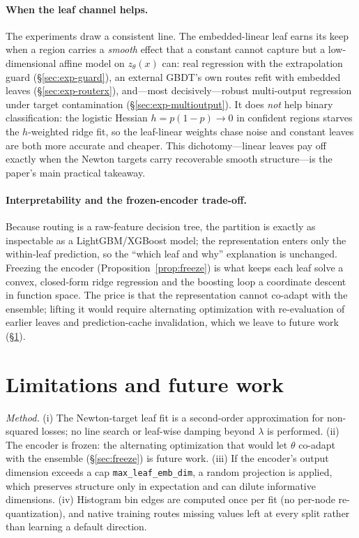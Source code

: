 \documentclass[11pt]{article}
\newcommand{\zt}{z_{\theta}}
\begin{document}
\paragraph{When the leaf channel helps.}
The experiments draw a consistent line. The embedded-linear leaf earns its keep when a
region carries a \emph{smooth} effect that a constant cannot capture but a
low-dimensional affine model on $\zt(x)$ can: real regression with the extrapolation guard
(\S\ref{sec:exp-guard}), an external GBDT's own routes refit with embedded leaves
(\S\ref{sec:exp-routerx}), and---most decisively---robust multi-output regression under
target contamination (\S\ref{sec:exp-multioutput}). It does \emph{not} help binary
classification: the logistic Hessian $h=p(1-p)\to0$ in confident regions starves the
$h$-weighted ridge fit, so the leaf-linear weights chase noise and constant leaves are both
more accurate and cheaper. This dichotomy---linear leaves pay off exactly when the Newton
targets carry recoverable smooth structure---is the paper's main practical takeaway.

\paragraph{Interpretability and the frozen-encoder trade-off.}
Because routing is a raw-feature decision tree, the partition is exactly as inspectable as a
LightGBM/XGBoost model; the representation enters only the within-leaf prediction, so the
``which leaf and why'' explanation is unchanged. Freezing the encoder
(Proposition~\ref{prop:freeze}) is what keeps each leaf solve a convex, closed-form ridge
regression and the boosting loop a coordinate descent in function space. The price is that
the representation cannot co-adapt with the ensemble; lifting it would require alternating
optimization with re-evaluation of earlier leaves and prediction-cache invalidation, which
we leave to future work (\S\ref{sec:limitations}).

\section{Limitations and future work}
\label{sec:limitations}

\emph{Method.}
(i) The Newton-target leaf fit is a second-order approximation for non-squared losses; no
line search or leaf-wise damping beyond $\lambda$ is performed. (ii) The encoder is frozen:
the alternating optimization that would let $\theta$ co-adapt with the ensemble
(\S\ref{sec:freeze}) is future work. (iii) If the encoder's output dimension exceeds a cap
\texttt{max\_leaf\_emb\_dim}, a random projection is applied, which preserves structure only
in expectation and can dilute informative dimensions. (iv) Histogram bin edges are computed
once per fit (no per-node re-quantization), and native training routes missing values left
at every split rather than learning a default direction.
\end{document}
